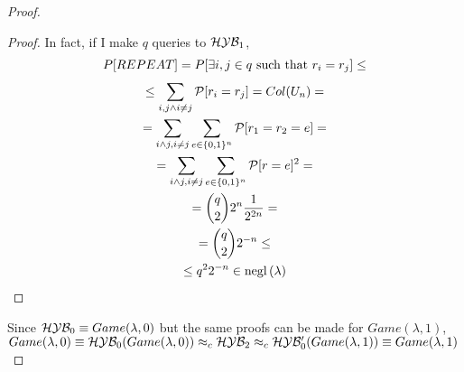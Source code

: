 \begin{proof}
\begin{proof}
In fact, if I make $q$ queries to $\mathcal{H}\mathcal{Y}\mathcal{B}_{1}$, 
\begin{gather*}
P[REPEAT]=P[ \exists i, j \in q \text{ such that } r_{i}=r_{j}] \leq \\
\leq \sum_{i,j \wedge i \not= j}^{} \mathcal{P} [ r_{i}=r_{j} ]   = Col(U_{n}) = \\
= \sum_{i \wedge j, i \not= j} \sum_{e \in \{0,1\}^{n}} \mathcal{P} [ r_{1}=r_{2}=e ]  = \\
=\sum_{i \wedge j, i \not= j} \sum_{e \in \{0,1\}^{n}} \mathcal{P}[ r=e ]^{2}  = \\
= {q \choose 2} 2^{n} \frac{1}{2^{2n}} = \\
={q\choose 2} 2^{-n} \leq \\
\leq q^{2}2^{-n} \in \mathrm{negl}\left({\lambda}\right) 
\end{gather*} 
\end{proof}

Since $\mathcal{H}\mathcal{Y}\mathcal{B}_{0} \equiv Game(\lambda, 0)$ but the same proofs can be made for $Game(\lambda, 1)$, $ Game(\lambda, 0) \equiv \mathcal{H}\mathcal{Y}\mathcal{B}_{0}(Game(\lambda, 0)) \approx_{c} \mathcal{H}\mathcal{Y}\mathcal{B}_{2} \approx_{c} \mathcal{H}\mathcal{Y}\mathcal{B}'_{0}(Game(\lambda,1)) \equiv Game(\lambda, 1)$
\end{proof}

